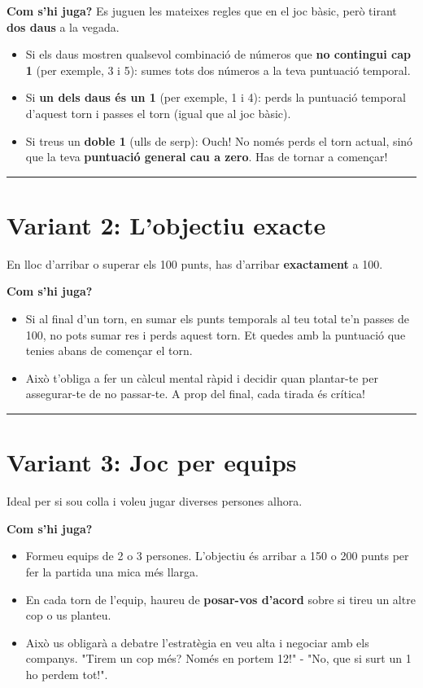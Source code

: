 \documentclass[12pt,a4paper]{article}
\begin{document}
\textbf{Com s'hi juga?}
Es juguen les mateixes regles que en el joc bàsic, però tirant \textbf{dos daus} a la vegada.
\begin{itemize}
\item Si els daus mostren qualsevol combinació de números que \textbf{no contingui cap 1} (per exemple, 3 i 5): sumes tots dos números a la teva puntuació temporal.
\item Si \textbf{un dels daus és un 1} (per exemple, 1 i 4): perds la puntuació temporal d'aquest torn i passes el torn (igual que al joc bàsic).
\item Si treus un \textbf{doble 1} (ulls de serp): Ouch! No només perds el torn actual, sinó que la teva \textbf{puntuació general cau a zero}. Has de tornar a començar!
\end{itemize}

\vspace{0.5cm}
\hrule
\vspace{0.5cm}

\section*{Variant 2: L'objectiu exacte}

En lloc d'arribar o superar els 100 punts, has d'arribar \textbf{exactament} a 100.

\textbf{Com s'hi juga?}
\begin{itemize}
\item Si al final d'un torn, en sumar els punts temporals al teu total te'n passes de 100, no pots sumar res i perds aquest torn. Et quedes amb la puntuació que tenies abans de començar el torn.
\item Això t'obliga a fer un càlcul mental ràpid i decidir quan plantar-te per assegurar-te de no passar-te. A prop del final, cada tirada és crítica!
\end{itemize}

\vspace{0.5cm}
\hrule
\vspace{0.5cm}

\section*{Variant 3: Joc per equips}

Ideal per si sou colla i voleu jugar diverses persones alhora.

\textbf{Com s'hi juga?}
\begin{itemize}
\item Formeu equips de 2 o 3 persones. L'objectiu és arribar a 150 o 200 punts per fer la partida una mica més llarga.
\item En cada torn de l'equip, haureu de \textbf{posar-vos d'acord} sobre si tireu un altre cop o us planteu.
\item Això us obligarà a debatre l'estratègia en veu alta i negociar amb els companys. "Tirem un cop més? Només en portem 12!" - "No, que si surt un 1 ho perdem tot!".
\end{itemize}
\end{document}
